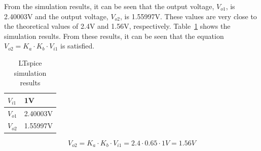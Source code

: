 \documentclass{zc-ust-hw}
\begin{document}
\newpage

From the simulation results, it can be seen that the output voltage, $V_{o1}$,
is 2.40003V and the output voltage, $V_{o2}$, is 1.55997V. These values are
very close to the theoretical values of 2.4V and 1.56V, respectively.
Table~\ref{tab:3} shows the simulation results. From these results, it can be
seen that the equation $V_{o2} = K_a \cdot K_b \cdot V_{i1}$ is satisfied.

\begin{table}[htpb]
  \caption{LTspice simulation results}\label{tab:3}
  \begin{center}
    \begin{tabular}[c]{|l|l|}
      \hline
      $V_{i1}$ & 1V \\
      \hline
      $V_{o1}$ & 2.40003V \\
      \hline
      $V_{o2}$ & 1.55997V \\
      \hline
    \end{tabular}
  \end{center}
\end{table}

\begin{equation}
  V_{o2} = K_a \cdot K_b \cdot V_{i1} = 2.4 \cdot 0.65 \cdot 1V = 1.56V
\end{equation}
\end{document}
